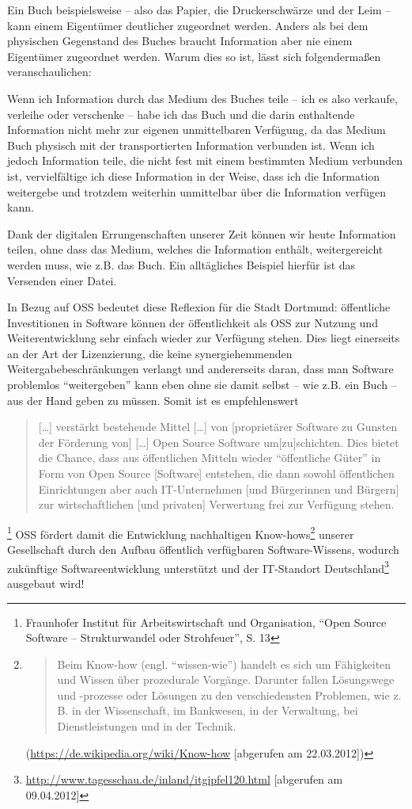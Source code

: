 \documentclass[a4paper]{scrartcl}
\begin{document}
Ein Buch beispielsweise -- also das Papier, die Druckerschwärze und der Leim --
kann einem Eigentümer deutlicher zugeordnet werden.  Anders als bei dem
physischen Gegenstand des Buches braucht Information aber nie einem Eigentümer
zugeordnet werden. Warum dies so ist, lässt sich folgendermaßen
veranschaulichen:

Wenn ich Information durch das Medium des Buches teile -- ich es also verkaufe,
verleihe oder verschenke -- habe ich das Buch und die darin enthaltende
Information nicht mehr zur eigenen unmittelbaren Verfügung, da das Medium Buch
physisch mit der transportierten Information verbunden ist. Wenn ich jedoch
Information teile, die nicht fest mit einem bestimmten Medium verbunden ist,
vervielfältige ich diese Information in der Weise, dass ich die Information
weitergebe und trotzdem weiterhin unmittelbar über die Information verfügen
kann.

Dank der digitalen Errungenschaften unserer Zeit können wir heute Information
teilen, ohne dass das Medium, welches die Information enthält, weitergereicht
werden muss, wie z.B. das Buch. Ein alltägliches Beispiel hierfür ist das
Versenden einer Datei.

In Bezug auf OSS bedeutet diese Reflexion für die Stadt Dortmund: öffentliche
Investitionen in Software können der öffentlichkeit als OSS zur Nutzung und
Weiterentwicklung sehr einfach wieder zur Verfügung stehen. Dies liegt
einerseits an der Art der Lizenzierung, die keine synergiehemmenden
Weitergabebeschränkungen verlangt und andererseits daran, dass man Software
problemlos ``weitergeben'' kann eben ohne sie damit selbst -- wie z.B. ein Buch
-- aus der Hand geben zu müssen. Somit ist es empfehlenswert \begin{quote}
  [\ldots] verstärkt bestehende Mittel [{\dots}] von [proprietärer Software zu
  Gunsten der Förderung von] [\ldots] Open Source Software um[zu]schichten. Dies
  bietet die Chance, dass aus öffentlichen Mitteln wieder ``öffentliche Güter''
  in Form von Open Source [Software] entstehen, die dann sowohl öffentlichen
  Einrichtungen aber auch IT-Unternehmen [und Bürgerinnen und Bürgern] zur
  wirtschaftlichen [und privaten] Verwertung frei zur Verfügung
  stehen.\end{quote}\footnote{Fraunhofer Institut für Arbeitswirtschaft und
  Organisation, ``Open Source Software -- Strukturwandel oder Strohfeuer'',
  S. 13} OSS fördert damit die Entwicklung nachhaltigen
Know-hows\footnote{\begin{quote}Beim Know-how (engl.  ``wissen-wie'') handelt es
    sich um Fähigkeiten und Wissen über prozedurale Vorgänge. Darunter fallen
    Lösungswege und -prozesse oder Lösungen zu den verschiedensten Problemen,
    wie z. B. in der Wissenschaft, im Bankwesen, in der Verwaltung, bei
    Dienstleistungen und in der Technik.\end{quote}
  (\url{https://de.wikipedia.org/wiki/Know-how} [abgerufen am 22.03.2012])}
unserer Gesellschaft durch den Aufbau öffentlich verfügbaren Software-Wissens,
wodurch zukünftige Softwareentwicklung unterstützt und der IT-Standort
Deutschland\footnote{\url{http://www.tagesschau.de/inland/itgipfel120.html}
  [abgerufen am 09.04.2012]} ausgebaut wird!
\end{document}

